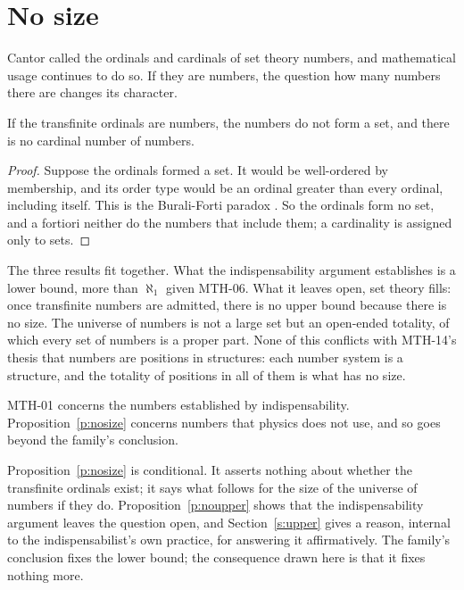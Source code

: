 \documentclass{situationist-preprint}
\begin{document}
\section{No size}\label{s:nosize}

Cantor called the ordinals and cardinals of set theory numbers, and mathematical usage continues to do so. If they are numbers, the question how many numbers there are changes its character.

\begin{proposition}\label{p:nosize}
If the transfinite ordinals are numbers, the numbers do not form a set, and there is no cardinal number of numbers.
\end{proposition}

\begin{proof}
Suppose the ordinals formed a set. It would be well-ordered by membership, and its order type would be an ordinal greater than every ordinal, including itself. This is the Burali-Forti paradox \citep{BuraliForti1897}. So the ordinals form no set, and a fortiori neither do the numbers that include them; a cardinality is assigned only to sets.
\end{proof}

The three results fit together. What the indispensability argument establishes is a lower bound, more than $\aleph_1$ given MTH-06. What it leaves open, set theory fills: once transfinite numbers are admitted, there is no upper bound because there is no size. The universe of numbers is not a large set but an open-ended totality, of which every set of numbers is a proper part. None of this conflicts with MTH-14's thesis that numbers are positions in structures: each number system is a structure, and the totality of positions in all of them is what has no size.

\begin{objection}[Overreach]
MTH-01 concerns the numbers established by indispensability. Proposition~\ref{p:nosize} concerns numbers that physics does not use, and so goes beyond the family's conclusion.
\end{objection}

\begin{reply}
Proposition~\ref{p:nosize} is conditional. It asserts nothing about whether the transfinite ordinals exist; it says what follows for the size of the universe of numbers if they do. Proposition~\ref{p:noupper} shows that the indispensability argument leaves the question open, and Section~\ref{s:upper} gives a reason, internal to the indispensabilist's own practice, for answering it affirmatively. The family's conclusion fixes the lower bound; the consequence drawn here is that it fixes nothing more.
\end{reply}
\end{document}
